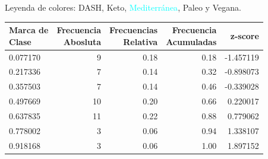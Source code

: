 \documentclass[12pt,a4paper]{article}
\begin{document}
{{            Leyenda de colores: \textcolor{Mulberry}{DASH}, \textcolor{BurntOrange}{Keto}, 
            \textcolor{Cyan}{Mediterránea}, \textcolor{Mahogany}{Paleo} y \textcolor{PineGreen}{Vegana}.

            \begin{center}
                \begin{tabular}{lrrrr}
                \toprule
                    \makecell{Marca de\\Clase} & \makecell{Frecuencia\\Abosluta} & \makecell{Frecuencias\\Relativa} & \makecell{Frecuencia\\Acumuladas} & z-score \\
                \midrule
                    0.077170 &  9 & 0.18 & 0.18 & -1.457119 \\
                    0.217336 &  7 & 0.14 & 0.32 & -0.898073 \\
                    0.357503 &  7 & 0.14 & 0.46 & -0.339028 \\
                    0.497669 & 10 & 0.20 & 0.66 & 0.220017 \\
                    0.637835 & 11 & 0.22 & 0.88 & 0.779062 \\
                    0.778002 &  3 & 0.06 & 0.94 & 1.338107 \\
                    0.918168 &  3 & 0.06 & 1.00 & 1.897152 \\
                \bottomrule
                \end{tabular}
            \end{center}

}}
\end{document}
